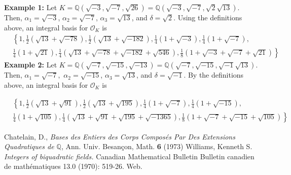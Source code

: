 \documentclass{amsart}
\begin{document}
\textbf{Example 1:} Let $K = \mathbb{Q}\left(\sqrt{-3},\sqrt{-7},\sqrt{26}\right) = \mathbb{Q}\left(\sqrt{-3},\sqrt{-7},\sqrt{2}\sqrt{13}\right)$. Then, $\alpha_1 = \sqrt{-3}$, $\alpha_2 = \sqrt{-7}$, $\alpha_3 = \sqrt{13}$, and $\delta = \sqrt{2}$. Using the definitions above, an integral basis for $\mathcal{O}_K$ is 
\begin{align*}
      & \left\{1, \frac{1}{2}(\sqrt{13} + \sqrt{-78}), \frac{1}{2}(\sqrt{13} + \sqrt{-182}),  \frac{1}{4}(1 + \sqrt{-3}), \frac{1}{4}(1 + \sqrt{-7}), \right. \\
      &  \left. \frac{1}{4}(1 + \sqrt{21}), \frac{1}{4}(\sqrt{13} + \sqrt{-78} + \sqrt{-182} + \sqrt{546}), \frac{1}{8}(1 + \sqrt{-3} + \sqrt{-7} + \sqrt{21}) \right\}
\end{align*}
\textbf{Example 2:} Let $K = \mathbb{Q}\left(\sqrt{-7},\sqrt{-15}, \sqrt{-13}\right) = \mathbb{Q}\left(\sqrt{-7},\sqrt{-15},\sqrt{-1}\sqrt{13}\right)$. Then, $\alpha_1 = \sqrt{-7},$ $\alpha_2 = \sqrt{-15}$, $\alpha_3 = \sqrt{13}$, and $\delta = \sqrt{-1}$. By the definitions above, an integral basis for $\mathcal{O}_K$ is 

\begin{align*}
      & \left\{1, \frac{1}{2}\left(\sqrt{13} + \sqrt{91}\right), \frac{1}{2}\left(\sqrt{13} + \sqrt{195}\right), \frac{1}{4}\left(1+\sqrt{-7}\right), \frac{1}{4}\left(1+\sqrt{-15}\right), \right. \\
      &  \left. \frac{1}{4}\left(1+\sqrt{105}\right), \frac{1}{4}\left(\sqrt{13} + \sqrt{91} + \sqrt{195} + \sqrt{-1365}\right), \frac{1}{8}\left(1 + \sqrt{-7} + \sqrt{-15} + \sqrt{105}\right) \right\}
\end{align*}

\begin{thebibliography}{}

  Chatelain, D., \textit{Bases des Entiers des Corps Compos\'es Par Des Extensions Quadratiques de $\mathbb{Q}$}, Ann. Univ. Besan\c{c}on, Math. \textbf{6} (1973)
  Williams, Kenneth S. \textit{Integers of biquadratic fields.} Canadian Mathematical Bulletin Bulletin canadien de mathématiques 13.0 (1970): 519-26. Web.
 \end{thebibliography}
 
\end{document}
